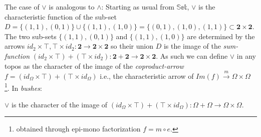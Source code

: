 \newpage
The case of $\lor$ is analogous to $\land$: \newline
Starting as usual from $\mathbb{Set}$, $\lor$ is the characteristic function of the sub-set $D = \{(1,1),(0,1)\} \cup \{(1,1),(1,0)\}=\{(0,1),(1,0),(1,1)\} \subset \textbf{2}\times\textbf{2}$. The two sub-sets $\{(1,1),(0,1)\}$ and $\{(1,1),(1,0)\}$ are determined by the arrows $id_2 \times \top, \top \times id_2 : \textbf{2} \rightarrow \textbf{2} \times \textbf{2}$ so their union $D$ is the image of the \emph{sum-function} $(id_2 \times \top) + (\top \times id_2) : \textbf{2} + \textbf{2} \rightarrow \textbf{2} \times \textbf{2} $. \newline
As such we can define $\lor$ in any topos as the character of the image of the \emph{coproduct-arrow} $f = (id_\Omega \times \top) + (\top \times id_\Omega)$ i.e., the characteristic arrow of $Im(f) \xrightarrow{m} \Omega \times \Omega$ \footnote{obtained through epi-mono factorization $f=m \circ e$.}.
In \emph{bushes}:

\begin{definition}[$\lor$] 
$\lor$ is the character of the image of  $(id_\Omega \times \top) + (\top \times id_\Omega) : \Omega + \Omega \rightarrow \Omega \times \Omega $.
\end{definition}


